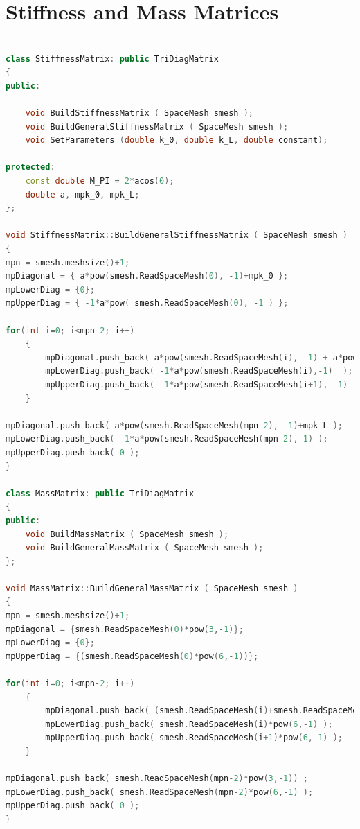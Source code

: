\documentclass{uonmathreport}
\theoremstyle{definition}
\theoremstyle{problem}
\theoremstyle{theorem}
\begin{document}
\section{Stiffness and Mass Matrices} \label{app:Stiff/Mass}

\begin{lstlisting}[language=C++]

class StiffnessMatrix: public TriDiagMatrix
{
public:

    void BuildStiffnessMatrix ( SpaceMesh smesh );
    void BuildGeneralStiffnessMatrix ( SpaceMesh smesh );
    void SetParameters (double k_0, double k_L, double constant);

protected:
    const double M_PI = 2*acos(0);
    double a, mpk_0, mpk_L;
};

void StiffnessMatrix::BuildGeneralStiffnessMatrix ( SpaceMesh smesh )
{
mpn = smesh.meshsize()+1;
mpDiagonal = { a*pow(smesh.ReadSpaceMesh(0), -1)+mpk_0 };
mpLowerDiag = {0};
mpUpperDiag = { -1*a*pow( smesh.ReadSpaceMesh(0), -1 ) };

for(int i=0; i<mpn-2; i++)
    {
        mpDiagonal.push_back( a*pow(smesh.ReadSpaceMesh(i), -1) + a*pow(smesh.ReadSpaceMesh(i+1), -1) );
        mpLowerDiag.push_back( -1*a*pow(smesh.ReadSpaceMesh(i),-1)  );
        mpUpperDiag.push_back( -1*a*pow(smesh.ReadSpaceMesh(i+1), -1) );
    }

mpDiagonal.push_back( a*pow(smesh.ReadSpaceMesh(mpn-2), -1)+mpk_L );
mpLowerDiag.push_back( -1*a*pow(smesh.ReadSpaceMesh(mpn-2),-1) );
mpUpperDiag.push_back( 0 );
}

class MassMatrix: public TriDiagMatrix
{
public:
    void BuildMassMatrix ( SpaceMesh smesh );
    void BuildGeneralMassMatrix ( SpaceMesh smesh );
};

void MassMatrix::BuildGeneralMassMatrix ( SpaceMesh smesh )
{
mpn = smesh.meshsize()+1;
mpDiagonal = {smesh.ReadSpaceMesh(0)*pow(3,-1)};
mpLowerDiag = {0};
mpUpperDiag = {(smesh.ReadSpaceMesh(0)*pow(6,-1))};

for(int i=0; i<mpn-2; i++)
    {
        mpDiagonal.push_back( (smesh.ReadSpaceMesh(i)+smesh.ReadSpaceMesh(i+1))*pow(3,-1) );
        mpLowerDiag.push_back( smesh.ReadSpaceMesh(i)*pow(6,-1) );
        mpUpperDiag.push_back( smesh.ReadSpaceMesh(i+1)*pow(6,-1) );
    }

mpDiagonal.push_back( smesh.ReadSpaceMesh(mpn-2)*pow(3,-1)) ;
mpLowerDiag.push_back( smesh.ReadSpaceMesh(mpn-2)*pow(6,-1) );
mpUpperDiag.push_back( 0 );
}

\end{lstlisting}
\end{document}
